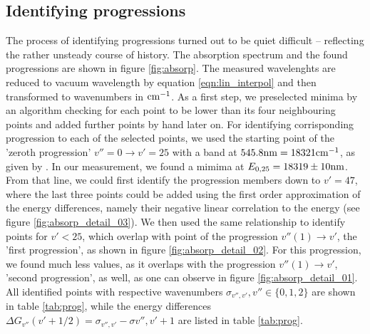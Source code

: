 \subsection{Identifying progressions}
The process of identifying progressions turned out to be quiet difficult – reflecting the 
rather unsteady course of history. 
The absorption spectrum and the found progressions are shown in figure \ref{fig:absorp}.
The measured wavelenghts are reduced to vacuum wavelength by equation \eqref{eqn:lin_interpol} 
and then transformed to wavenumbers in $\mathrm{cm^{-1}}$. 
As a first step, we preselected minima by an algorithm checking for each point to be lower than 
its four neighbouring points and added further points by hand later on. For identifying corrisponding 
progression to each of the selected points, we used the starting point of the 'zeroth progression' 
$v'' = 0  \rightarrow v' = 25$ with a band at $545.8 \mathrm{nm} = 18321 \mathrm{cm^{-1}}$, as given by \cite{}. In our 
measurement, we found a mimima at $E_{0, 25} = 18319 \pm 10\mathrm{nm}$. From that line, we could first 
identify the progression members down to $v' = 47$, where the last three points could be added using 
the first order approximation of the energy differences, namely their negative linear correlation 
to the energy (see figure \ref{fig:absorp_detail_03}). We then used the same relationship to identify 
points for $v' < 25$, which overlap with point of the progression $v''(1) \rightarrow v'$, the 
'first progression', 
as shown in figure \ref{fig:absorp_detail_02}. For this progression, we found much less values, as 
it overlaps with the progression $v''(1) \rightarrow v'$, 'second progression', as well, as one can 
observe in figure \ref{fig:absorp_detail_01}. All identified points with respective wavenumbers 
$\sigma_{v'', v'}, v'' \in \{0, 1, 2\}$ are shown in table \ref{tab:prog}, 
while the energy differences $\Delta G_{v''}(v' + 1 / 2) = \sigma_{v'', v'} - \sigma{v'', v' + 1}$ are 
listed in table \ref{tab:prog}.

